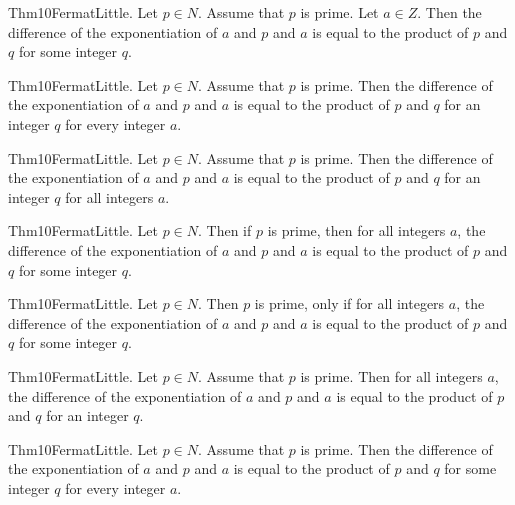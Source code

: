 \documentclass{article}
\begin{document}
Thm10FermatLittle. Let $p \in N$. Assume that $p$ is prime. Let $a \in Z$. Then the difference of the exponentiation of $a$ and $p$ and $a$ is equal to the product of $p$ and $q$ for some integer $q$.

Thm10FermatLittle. Let $p \in N$. Assume that $p$ is prime. Then the difference of the exponentiation of $a$ and $p$ and $a$ is equal to the product of $p$ and $q$ for an integer $q$ for every integer $a$.

Thm10FermatLittle. Let $p \in N$. Assume that $p$ is prime. Then the difference of the exponentiation of $a$ and $p$ and $a$ is equal to the product of $p$ and $q$ for an integer $q$ for all integers $a$.

Thm10FermatLittle. Let $p \in N$. Then if $p$ is prime, then for all integers $a$, the difference of the exponentiation of $a$ and $p$ and $a$ is equal to the product of $p$ and $q$ for some integer $q$.

Thm10FermatLittle. Let $p \in N$. Then $p$ is prime, only if for all integers $a$, the difference of the exponentiation of $a$ and $p$ and $a$ is equal to the product of $p$ and $q$ for some integer $q$.

Thm10FermatLittle. Let $p \in N$. Assume that $p$ is prime. Then for all integers $a$, the difference of the exponentiation of $a$ and $p$ and $a$ is equal to the product of $p$ and $q$ for an integer $q$.

Thm10FermatLittle. Let $p \in N$. Assume that $p$ is prime. Then the difference of the exponentiation of $a$ and $p$ and $a$ is equal to the product of $p$ and $q$ for some integer $q$ for every integer $a$.
\end{document}

